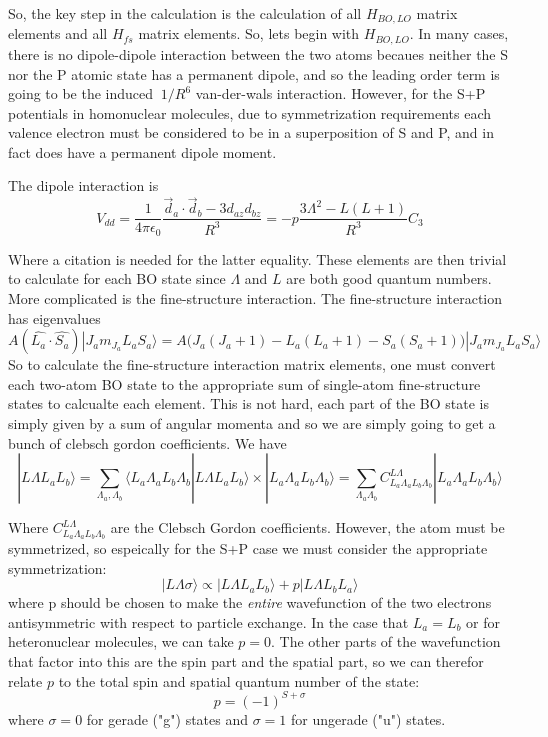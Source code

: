 \documentclass[prl, longbibliography]{revtex4-2}
\begin{document}
So, the key step in the calculation is the calculation of all $H_{BO,LO}$ matrix elements and all $H_{fs}$ matrix elements. So, lets begin with $H_{BO,LO}$. In many cases, there is no dipole-dipole interaction between the two atoms becaues neither the S nor the P atomic state has a permanent dipole, and so the leading order term is going to be the induced $~1/R^6$ van-der-wals interaction. However, for the S+P potentials in homonuclear molecules, due to symmetrization requirements each valence electron must be considered to be in a superposition of S and P, and in fact does have a permanent dipole moment. 

The dipole interaction is
\begin{equation}
V_{dd} = \frac{1}{4\pi\epsilon_0}\frac{\vec{d}_a\cdot\vec{d}_b - 3d_{az}d_{bz}}{R^3}=-p\frac{3\Lambda^2-L(L+1)}{R^3} C_3
\end{equation}

Where a citation is needed for the latter equality. These elements are then trivial to calculate for each BO state since $\Lambda$ and $L$ are both good quantum numbers. More complicated is the fine-structure interaction. The fine-structure interaction has eigenvalues
\begin{equation}
A(\hat{L_a}\cdot\hat{S_a})|J_a m_{J_a} L_a S_a\rangle = A\Big(J_a(J_a+1)-L_a(L_a+1)-S_a(S_a+1)\Big)|J_a m_{J_a} L_a S_a\rangle
\end{equation}
So to calculate the fine-structure interaction matrix elements, one must convert each two-atom BO state to the appropriate sum of single-atom fine-structure states to calcualte each element. This is not hard, each part of the BO state is simply given by a sum of angular momenta and so we are simply going to get a bunch of clebsch gordon coefficients. We have 
\begin{equation}
|L\Lambda L_a L_b\rangle=\sum_{\Lambda_a, \Lambda_b}\langle L_a \Lambda_a L_b \Lambda_b|L\Lambda L_a L_b\rangle\times|L_a \Lambda_a L_b \Lambda_b\rangle =\sum_{\Lambda_a \Lambda_b} C_{L_a \Lambda_a L_b \Lambda_b}^{L \Lambda} |L_a \Lambda_a L_b \Lambda_b\rangle
\end{equation}

Where $C_{L_a \Lambda_a L_b \Lambda_b}^{L \Lambda}$ are the Clebsch Gordon coefficients. However, the atom must be symmetrized, so espeically for the S+P case we must consider the appropriate symmetrization:
\begin{equation}
|L \Lambda \sigma\rangle \propto |L\Lambda L_a L_b\rangle + p |L\Lambda L_b L_a\rangle
\end{equation}
where p should be chosen to make the \emph{entire} wavefunction of the two electrons antisymmetric with respect to particle exchange. In the case that $L_a=L_b$ or for heteronuclear molecules, we can take $p=0$.  The other parts of the wavefunction that factor into this are the spin part and the spatial part, so we can therefor relate $p$ to the total spin and spatial quantum number of the state: 
\begin{equation}
p = (-1)^{S+\sigma}
\end{equation}
where $\sigma=0$ for gerade ("g") states and $\sigma=1$ for ungerade ("u") states.
\end{document}
